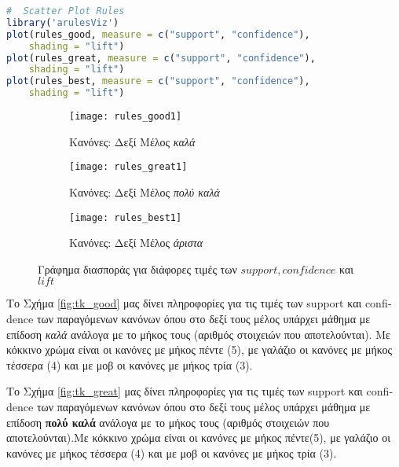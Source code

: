\documentclass[12pt,a4paper,final]{article}
\begin{document}
\begin{lstlisting}[language=R]
#  Scatter Plot Rules
library('arulesViz')
plot(rules_good, measure = c("support", "confidence"), 
	shading = "lift")
plot(rules_great, measure = c("support", "confidence"), 
	shading = "lift")
plot(rules_best, measure = c("support", "confidence"), 
	shading = "lift")
\end{lstlisting}
\graphicspath{{./arules/}}
\begin{figure}[h]
     \centering
     \begin{subfigure}[b]{0.475\textwidth}
         \centering
         \texttt{[image: rules\_good1]}
         \caption{Κανόνες: Δεξί Μέλος \textit{καλά}}
         \label{fig:r_good}
     \end{subfigure}
     \hfill
     \begin{subfigure}[b]{0.475\textwidth}
         \centering
         \texttt{[image: rules\_great1]}
         \caption{Κανόνες: Δεξί Μέλος \textit{πολύ καλά}}
         \label{fig:r_great}
     \end{subfigure}
     
     \begin{subfigure}[b]{0.475\textwidth}
         \centering
         \texttt{[image: rules\_best1]}
         \caption{Κανόνες: Δεξί Μέλος \textit{άριστα}}
         \label{fig:r_best}
     \end{subfigure}
        \label{fig:scatter_rules}
       	\caption{Γράφημα διασποράς για διάφορες τιμές των $support, confidence$ και $lift$}
\end{figure}
\clearpage 

Το Σχήμα \ref{fig:tk_good} μας δίνει πληροφορίες για τις τιμές των \foreignlanguage{english}{support} και \foreignlanguage{english}{confidence} των παραγόμενων κανόνων όπου στο δεξί τους μέλος υπάρχει μάθημα με επίδοση \textit{καλά} ανάλογα με το μήκος τους (αριθμός στοιχειών που αποτελούνται). Με κόκκινο χρώμα είναι οι κανόνες με μήκος πέντε (5), με γαλάζιο οι κανόνες με μήκος τέσσερα   (4) και με μοβ οι κανόνες με μήκος τρία (3). \medskip

Το Σχήμα \ref{fig:tk_great} μας δίνει πληροφορίες για τις τιμές των \foreignlanguage{english}{support} και \foreignlanguage{english}{confidence} των παραγόμενων κανόνων όπου στο δεξί τους μέλος υπάρχει μάθημα με επίδοση \textbf{πολύ καλά} ανάλογα με το μήκος τους (αριθμός στοιχειών που αποτελούνται).Με κόκκινο χρώμα είναι οι κανόνες με μήκος πέντε(5), με γαλάζιο οι κανόνες με μήκος τέσσερα (4) και με μοβ οι κανόνες με μήκος τρία (3). \medskip
\end{document}
